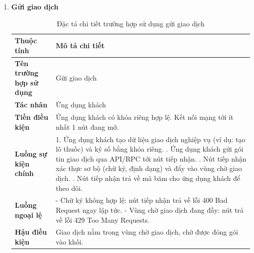 \documentclass[12pt,a4paper]{article}
\begin{document}
\begin{enumerate}[label=\textbf{\alph*)}]
    \item \textbf{Gửi giao dịch}
    \begin{table}[H]
        \centering
        \renewcommand{\arraystretch}{1.4} %
        \begin{tabularx}{\textwidth}{|p{3.5cm}|X|}
            \hline
            \textbf{Thuộc tính} & \textbf{Mô tả chi tiết} \\ \hline
            \textbf{Tên trường hợp sử dụng} & Gửi giao dịch \\ \hline
            \textbf{Tác nhân} & Ứng dụng khách \\ \hline
            \textbf{Tiền điều kiện} & Ứng dụng khách có khóa riêng hợp lệ. Kết nối mạng tới ít nhất 1 nút đang mở. \\ \hline
            \textbf{Luồng sự kiện chính} & 
            1. Ứng dụng khách tạo dữ liệu giao dịch nghiệp vụ (ví dụ: tạo lô thuốc) và ký số bằng khóa riêng. \newline
            2. Ứng dụng khách gửi gói tin giao dịch qua API/RPC tới nút tiếp nhận. \newline
            3. Nút tiếp nhận xác thực sơ bộ (chữ ký, định dạng) và đẩy vào vùng chờ giao dịch. \newline
            4. Nút tiếp nhận trả về mã băm cho ứng dụng khách để theo dõi. \\ \hline
            \textbf{Luồng ngoại lệ} & 
            - Chữ ký không hợp lệ: nút tiếp nhận trả về lỗi 400 Bad Request ngay lập tức. \newline
            - Vùng chờ giao dịch đang đầy: nút trả về lỗi 429 Too Many Requests. \\ \hline
            \textbf{Hậu điều kiện} & Giao dịch nằm trong vùng chờ giao dịch, chờ được đóng gói vào khối. \\ \hline
        \end{tabularx}
        \caption{Đặc tả chi tiết trường hợp sử dụng gửi giao dịch}
        \label{tab:dac_ta_gui_giao_dich}
    \end{table}

    \newpage


\end{enumerate}
\end{document}
